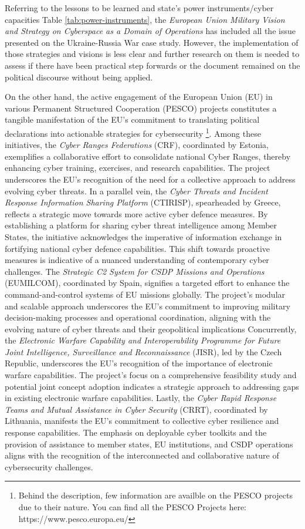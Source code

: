 Referring to the lessons to be learned and state’s power instruments/cyber capacities Table \ref{tab:power-instruments}, the \textit{European Union Military Vision and Strategy on Cyberspace as a Domain of Operations } has included all the issue presented on the Ukraine-Russia War case study. However, the implementation of those strategies and visions is less clear and further research on them is needed to assess if there have been practical step forwards or the document remained on the political discourse without being applied. 

On the other hand, the active engagement of the European Union (EU) in various  Permanent Structured Cooperation (PESCO) projects constitutes a tangible manifestation of the EU's commitment to translating political declarations into actionable strategies for cybersecurity \footnote{Behind the description, few information are availble on the PESCO projects due to their nature. You can find all the PESCO Projects here: https://www.pesco.europa.eu/ }. Among these initiatives, the\textit{ Cyber Ranges Federations} (CRF), coordinated by Estonia, exemplifies a collaborative effort to consolidate national Cyber Ranges, thereby enhancing cyber training, exercises, and research capabilities. The project underscores the EU's recognition of the need for a collective approach to address evolving cyber threats. In a parallel vein, the \textit{Cyber Threats and Incident Response Information Sharing Platform} (CTIRISP), spearheaded by Greece, reflects a strategic move towards more active cyber defence measures. By establishing a platform for sharing cyber threat intelligence among Member States, the initiative acknowledges the imperative of information exchange in fortifying national cyber defence capabilities. This shift towards proactive measures is indicative of a nuanced understanding of contemporary cyber challenges. The \textit{Strategic C2 System for CSDP Missions and Operations} (EUMILCOM), coordinated by Spain, signifies a targeted effort to enhance the command-and-control systems of EU missions globally. The project's modular and scalable approach underscores the EU's commitment to improving military decision-making processes and operational coordination, aligning with the evolving nature of cyber threats and their geopolitical implications Concurrently, the \textit{Electronic Warfare Capability and Interoperability Programme for Future Joint Intelligence, Surveillance and Reconnaissance} (JISR), led by the Czech Republic, underscores the EU's recognition of the importance of electronic warfare capabilities. The project's focus on a comprehensive feasibility study and potential joint concept adoption indicates a strategic approach to addressing gaps in existing electronic warfare capabilities. Lastly, the \textit{Cyber Rapid Response Teams and Mutual Assistance in Cyber Security} (CRRT), coordinated by Lithuania, manifests the EU's commitment to collective cyber resilience and response capabilities. The emphasis on deployable cyber toolkits and the provision of assistance to member states, EU institutions, and CSDP operations aligns with the recognition of the interconnected and collaborative nature of cybersecurity challenges.

